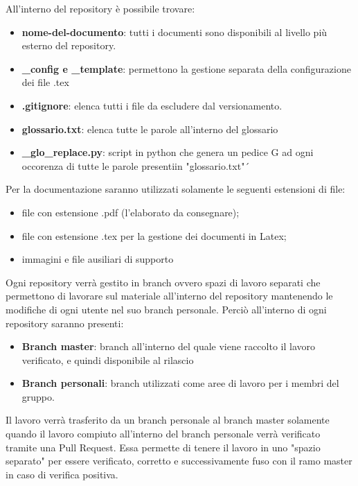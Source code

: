 			All'interno del repository è possibile trovare:
			\begin{itemize}
				\item \textbf{nome-del-documento}: tutti i documenti sono disponibili al livello più esterno del repository.
				\item \textbf{\_config e \_template}: permettono la gestione separata della configurazione dei file .tex
				\item \textbf{.gitignore}: elenca tutti i file da escludere dal versionamento.
				\item \textbf{glossario.txt}: elenca tutte le parole all'interno del glossario
				\item \textbf{\_glo\_replace.py}: script in python che genera un pedice G ad ogni occorenza di tutte le parole presentiin "glossario.txt"´
			\end{itemize}
			
			Per la documentazione saranno utilizzati solamente le seguenti estensioni di file:
			\begin{itemize}
				\item file con estensione .pdf (l'elaborato da consegnare);
				\item file con estensione .tex per la gestione dei documenti in Latex;
				\item immagini e file ausiliari di supporto
			\end{itemize}
		
			Ogni repository verrà gestito in branch ovvero spazi di lavoro separati che permettono di lavorare sul materiale all'interno del repository mantenendo le modifiche di ogni utente nel suo branch personale. Perciò all'interno di ogni repository saranno presenti:
			\begin{itemize}
				\item \textbf{Branch master}: branch all'interno del quale viene raccolto il lavoro verificato, e quindi disponibile al rilascio
				\item \textbf{Branch personali}: branch utilizzati come aree di lavoro per i membri del gruppo.
			\end{itemize}
			Il lavoro verrà trasferito da un branch personale al branch master solamente quando il lavoro compiuto all'interno del branch personale verrà verificato tramite una Pull Request. Essa permette di tenere il lavoro in uno "spazio separato" per essere verificato, corretto e successivamente fuso con il ramo master in caso di verifica positiva.
			
